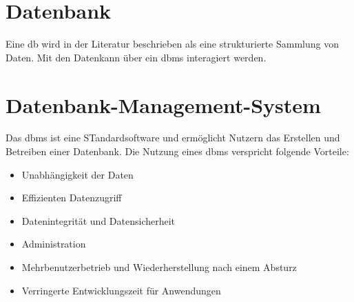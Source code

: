 \section{Datenbank}
Eine \acrfull{db} wird in der Literatur beschrieben als eine strukturierte Sammlung von Daten. Mit den Datenkann über ein \acrfull{dbms} interagiert werden\cite{DatabaseManagementSystems.2003,Jarke.1984}.

\section{Datenbank-Management-System}

Das \acrfull{dbms} ist eine STandardsoftware und ermöglicht Nutzern das Erstellen und Betreiben einer Datenbank. Die Nutzung eines \acrshort{dbms} verspricht folgende Vorteile\cite{DatabaseManagementSystems.2003}:
\begin{itemize}
	\item Unabhängigkeit der Daten
	\item Effizienten Datenzugriff
	\item Datenintegrität und Datensicherheit
	\item Administration
	\item Mehrbenutzerbetrieb und Wiederherstellung nach einem Absturz
	\item Verringerte Entwicklungszeit für Anwendungen
\end{itemize}
